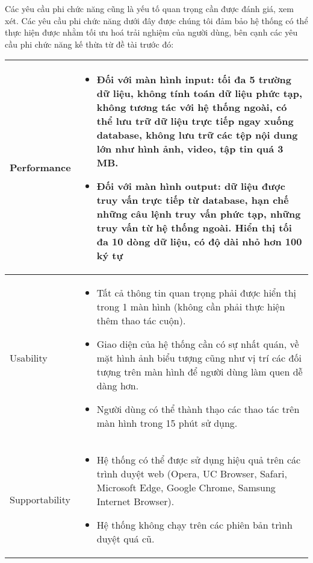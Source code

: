 Các yêu cầu phi chức năng cũng là yếu tố quan trọng cần được đánh giá, xem xét.
Các yêu cầu phi chức năng dưới đây được chúng tôi đảm bảo hệ thống có thể thực
hiện được nhằm tối ưu hoá trải nghiệm của người dùng, bên cạnh các yêu cầu phi
chức năng kế thừa từ đề tài trước đó:
\begin{center}
    \begin{tabular}{ |m{2.5cm}|m{11.5cm}|}
        \hline
        Performance    & \begin{itemize}
                             \item Đối với màn hình input: tối đa 5 trường dữ liệu, không tính toán dữ liệu phức tạp, không tương tác với hệ thống ngoài, có thể lưu trữ dữ liệu trực
                                   tiếp ngay xuống database, không lưu trữ các tệp nội dung lớn như hình ảnh, video, tập tin quá 3 MB.
                             \item Đối với màn hình output: dữ liệu được truy vấn trực tiếp từ database, hạn chế những câu lệnh truy vấn phức tạp, những truy vấn từ hệ thống ngoài.
                                   Hiển thị tối đa 10 dòng dữ liệu, có độ dài nhỏ hơn 100 ký tự
                         \end{itemize} \\
        \hline
        Usability      & \begin{itemize}
                             \item Tất cả thông tin quan trọng phải được hiển thị trong 1 màn hình (không cần phải
                                   thực hiện thêm thao tác cuộn).
                             \item Giao diện của hệ thống cần có sự nhất quán, về mặt hình ảnh biểu tượng cũng như
                                   vị trí các đối tượng trên màn hình để người dùng làm quen dễ dàng hơn.
                             \item Người dùng có thể thành thạo các thao tác trên màn hình trong 15 phút sử dụng.
                         \end{itemize}                                                                    \\
        \hline
        Supportability & \begin{itemize}
                             \item Hệ thống có thể được sử dụng hiệu quả trên các trình duyệt web (Opera, UC
                                   Browser, Safari, Microsoft Edge, Google Chrome, Samsung Internet Browser).
                             \item Hệ thống không chạy trên các phiên bản trình duyệt quá cũ.

\end{itemize}
\end{tabular}
\end{center}
